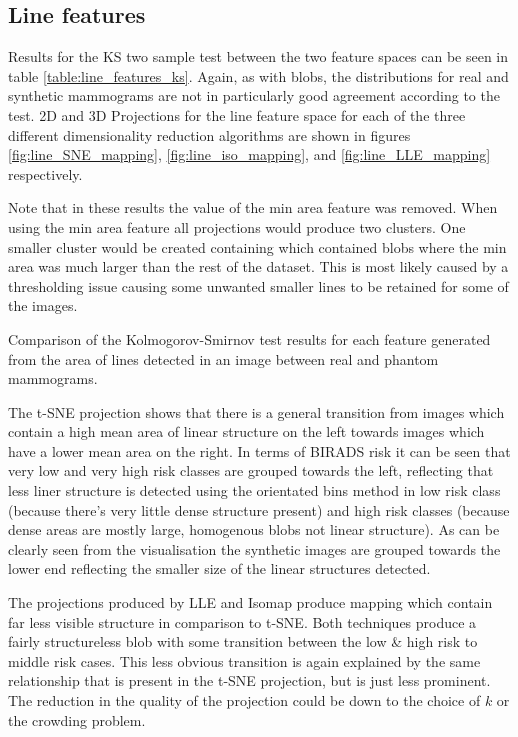 \subsection{Line features}
Results for the KS two sample test between the two feature spaces can be seen in table \ref{table:line_features_ks}. Again, as with blobs, the distributions for real and synthetic mammograms are not in particularly good agreement according to the test. 2D and 3D Projections for the line feature space for each of the three different dimensionality reduction algorithms are shown in figures \ref{fig:line_SNE_mapping}, \ref{fig:line_iso_mapping}, and \ref{fig:line_LLE_mapping} respectively.
 
Note that in these results the value of the min area feature was removed. When using the min area feature all projections would produce two clusters. One smaller cluster would be created containing which contained blobs where the min area was much larger than the rest of the dataset. This is most likely caused by a thresholding issue causing some unwanted smaller lines to be retained for some of the images.

\begin{table}[H]
\label{table:line_features_ks}
\centering
{}
\caption{Comparison of the Kolmogorov-Smirnov test results for each feature generated from the area of lines detected in an image between real and phantom mammograms.}
\end{table}

The t-SNE projection shows that there is a general transition from images which contain a high mean area of linear structure on the left towards images which have a lower mean area on the right. In terms of BIRADS risk it can be seen that very low and very high risk classes are grouped towards the left, reflecting that less liner structure is detected using the orientated bins method in low risk class (because there's very little dense structure present) and high risk classes (because dense areas are mostly large, homogenous blobs not linear structure). As can be clearly seen from the visualisation the synthetic images are grouped towards the lower end reflecting the smaller size of the linear structures detected. 

The projections produced by LLE and Isomap produce mapping which contain far less visible structure in comparison to t-SNE. Both techniques produce a fairly structureless blob with some transition between the low \& high risk to middle risk cases. This less obvious transition is again explained by the same relationship that is present in the t-SNE projection, but is just less prominent. The reduction in the quality of the projection could be down to the choice of $k$ or the crowding problem.

